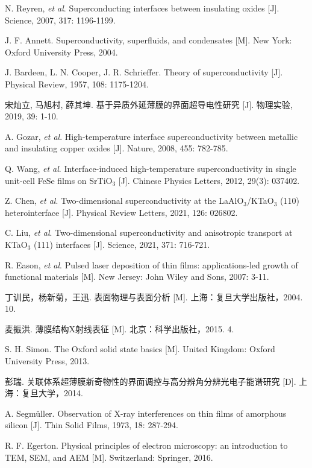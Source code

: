 \documentclass[12pt,a4paper,openany,twoside,UTF-8]{book}
\begin{document}
\begin{thebibliography}{99}
N. Reyren, \textit{et al}. Superconducting interfaces between insulating oxides [J]. Science, 2007, 317: 1196-1199.

J. F. Annett. Superconductivity, superfluids, and condensates [M]. New York: Oxford University Press, 2004.

J. Bardeen, L. N. Cooper, J. R. Schrieffer. Theory of superconductivity [J]. Physical Review, 1957, 108: 1175-1204.

宋灿立, 马旭村, 薛其坤. 基于异质外延薄膜的界面超导电性研究 [J]. 物理实验, 2019, 39: 1-10.

A. Gozar, \textit{et al}. High-temperature interface superconductivity between metallic and insulating copper oxides [J]. Nature, 2008, 455: 782-785.

Q. Wang, \textit{et al}. Interface-induced high-temperature superconductivity in single unit-cell FeSe films on SrTiO$_3$ [J]. Chinese Physics Letters, 2012, 29(3): 037402.

Z. Chen, \textit{et al}. Two-dimensional superconductivity at the LaAlO$_3$/KTaO$_3$ (110) heterointerface [J]. Physical Review Letters, 2021, 126: 026802.

C. Liu, \textit{et al}. Two-dimensional superconductivity and anisotropic transport at KTaO$_3$ (111) interfaces [J]. Science, 2021, 371: 716-721.

R. Eason, \textit{et al}. Pulsed laser deposition of thin films: applications-led growth of functional materials [M]. New Jersey: John Wiley and Sons, 2007: 3-11.

丁训民，杨新菊，王迅. 表面物理与表面分析 [M]. 上海：复旦大学出版社，2004. 10.

麦振洪. 薄膜结构X射线表征 [M]. 北京：科学出版社，2015. 4.

S. H. Simon. The Oxford solid state basics [M]. United Kingdom: Oxford University Press, 2013.

彭瑞. 关联体系超薄膜新奇物性的界面调控与高分辨角分辨光电子能谱研究 [D]. 上海：复旦大学，2014.

A. Segmüller. Observation of X-ray interferences on thin films of amorphous silicon [J]. Thin Solid Films, 1973, 18: 287-294.

R. F. Egerton. Physical principles of electron microscopy: an introduction to TEM, SEM, and AEM [M]. Switzerland: Springer, 2016.


\end{thebibliography}
\end{document}
